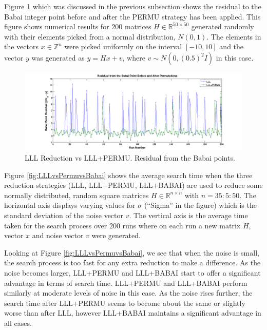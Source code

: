 \documentclass[12pt,Bold,letterpaper]{mcgilletdclass}
\begin{document}
Figure \ref{fig:LLLvsPermuBabai} which was discussed in the previous subsection
shows the residual to the Babai integer point before and after the PERMU strategy has
been applied. This figure shows numerical results for $200$ matrices $H \in\mathbb{R}^{50
\times 50}$ generated randomly with their elements picked from a normal
distribution, $N(0,1)$. The elements in the vectors $x \in \mathbb{Z}^n$ were picked
uniformly on the interval $[-10,10]$ and the vector $y$ was generated as $y = Hx
+ v$, where $v \sim N(0,(0.5)^2I)$ in this case.

\begin{figure}
\centering
\includegraphics[scale=0.36]{lllvslllpermubabai.png}
\caption{LLL Reduction vs LLL+PERMU. Residual from the Babai points.}
\label{fig:LLLvsPermuBabai}
\end{figure}

Figure \ref{fig:LLLvsPermuvsBabai} shows the average search time when the three reduction strategies (LLL, LLL+PERMU, LLL+BABAI) are used to reduce some normally distributed, random square matrices $H \in \mathbb{R}^{n \times n}$ with $ n = 35:5:50$. The horizontal axis displays varying values for $\sigma$ (``Sigma'' in the figure) which is the standard deviation of the noise vector $v$. The vertical axis is the average time taken for the search process over $200$ runs where on each run a new matrix $H$, vector $x$ and noise vector $v$ were generated.

Looking at Figure \ref{fig:LLLvsPermuvsBabai}, we see that when the noise is
small, the search process is too fast for any extra reduction to make a
difference. As the noise becomes larger, LLL+PERMU and LLL+BABAI start to offer a significant
advantage in terms of search time. LLL+PERMU and LLL+BABAI perform similarly at
moderate levels of noise in this case. As the noise rises further, the search time after LLL+PERMU seems to become about the same or slightly worse than after LLL, however LLL+BABAI maintains a significant
advantage in all cases.
\end{document}

